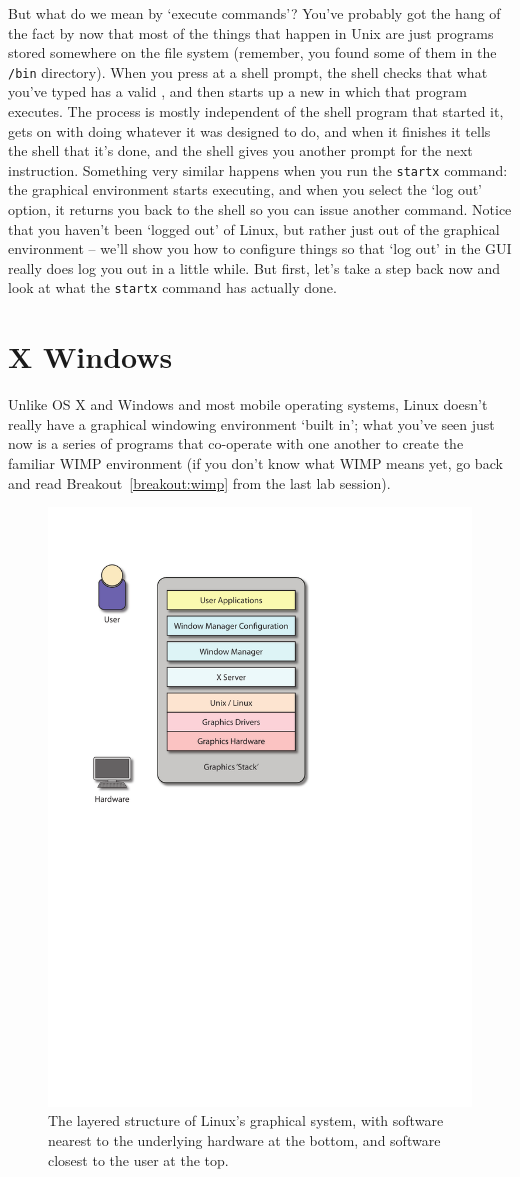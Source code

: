 But what do we mean by `execute commands'? You've probably got the hang of the fact by now that most of the things that happen in Unix are just programs stored somewhere on the file system (remember, you found some of them in the \texttt{/bin} directory). When you press  at a shell prompt, the  shell checks that what you've typed has a valid , and then starts up a new  in which that program executes. The process is mostly independent of the shell program that started it, gets on with doing whatever it was designed to do, and when it finishes it tells the shell that it's done, and the shell gives you another prompt for the next instruction. Something very similar happens when you run the \texttt{startx} command: the graphical environment starts executing, and when you select the `log out' option, it returns you back to the shell so you can issue another command. Notice that you haven't been `logged out' of Linux, but rather just out of the graphical environment -- we'll show you how to configure things so that `log out' in the GUI really does log you out in a little while. But first, let's take a step back now and look at what the \texttt{startx} command has actually done.

\section{X Windows}

Unlike OS X and Windows and most mobile operating systems, Linux doesn't really have a graphical windowing environment `built in'; what you've seen just now is a series of programs that co-operate with one another to  create the familiar WIMP environment (if you don't know what WIMP means yet, go back and read Breakout~\ref{breakout:wimp} from the last lab session).

\begin{figure}[htb]
  \begin{center}
    \includegraphics[width=.5\textwidth]{images/graphics-stack.pdf}
  \end{center}
\caption{The layered structure of Linux's graphical system, with software nearest to the underlying hardware at the bottom, and software closest to the user at the top.}
\label{figure:Xstructure}
\end{figure}


